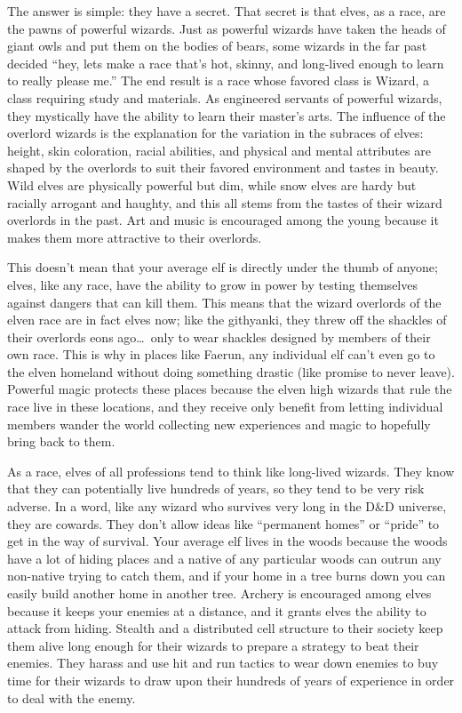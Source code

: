 The answer is simple: they have a secret. That secret is that elves, as a race, are the pawns of powerful wizards. Just as powerful wizards have taken the heads of giant owls and put them on the bodies of bears, some wizards in the far past decided ``hey, lets make a race that's hot, skinny, and long-lived enough to learn to really please me.'' The end result is a race whose favored class is Wizard, a class requiring study and materials. As engineered servants of powerful wizards, they mystically have the ability to learn their master's arts. The influence of the overlord wizards is the explanation for the variation in the subraces of elves: height, skin coloration, racial abilities, and physical and mental attributes are shaped by the overlords to suit their favored environment and tastes in beauty. Wild elves are physically powerful but dim, while snow elves are hardy but racially arrogant and haughty, and this all stems from the tastes of their wizard overlords in the past. Art and music is encouraged among the young because it makes them more attractive to their overlords.

This doesn't mean that your average elf is directly under the thumb of anyone; elves, like any race, have the ability to grow in power by testing themselves against dangers that can kill them. This means that the wizard overlords of the elven race are in fact elves now; like the githyanki, they threw off the shackles of their overlords eons ago\ldots\ only to wear shackles designed by members of their own race. This is why in places like Faerun, any individual elf can't even go to the elven homeland without doing something drastic (like promise to never leave). Powerful magic protects these places because the elven high wizards that rule the race live in these locations, and they receive only benefit from letting individual members wander the world collecting new experiences and magic to hopefully bring back to them.

As a race, elves of all professions tend to think like long-lived wizards. They know that they can potentially live hundreds of years, so they tend to be very risk adverse. In a word, like any wizard who survives very long in the D\&D universe, they are cowards. They don't allow ideas like ``permanent homes'' or ``pride'' to get in the way of survival. Your average elf lives in the woods because the woods have a lot of hiding places and a native of any particular woods can outrun any non-native trying to catch them, and if your home in a tree burns down you can easily build another home in another tree. Archery is encouraged among elves because it keeps your enemies at a distance, and it grants elves the ability to attack from hiding. Stealth and a distributed cell structure to their society keep them alive long enough for their wizards to prepare a strategy to beat their enemies. They harass and use hit and run tactics to wear down enemies to buy time for their wizards to draw upon their hundreds of years of experience in order to deal with the enemy.

